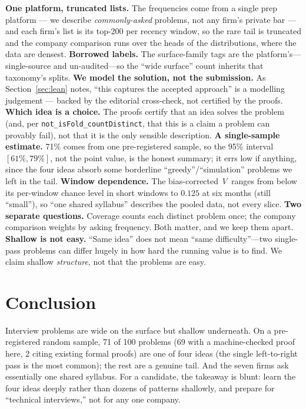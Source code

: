 \documentclass[11pt]{article}
\newcommand{\V}{\textit{V}}
\begin{document}
\textbf{One platform, truncated lists.} The frequencies come from a single prep platform ---
we describe \emph{commonly-asked} problems, not any firm's private bar --- and each firm's
list is its top-200 per recency window, so the rare tail is truncated and the company
comparison runs over the heads of the distributions, where the data are densest. \textbf{Borrowed labels.} The surface-family tags are the platform's---single-source and
un-audited---so the ``wide surface'' count inherits that taxonomy's splits. \textbf{We model the solution, not the
submission.} As Section~\ref{sec:lean} notes, ``this captures the accepted approach'' is a
modelling judgement --- backed by the editorial cross-check, not certified by the proofs. \textbf{Which idea is a choice.} The proofs
certify that an idea solves the problem
(and, per \texttt{not\_isFold\_countDistinct}, that this is a claim a problem can provably fail), not
that it is the only sensible description. \textbf{A single-sample estimate.} 71\% comes from one
pre-registered sample, so the 95\% interval $[61\%,79\%]$, not the point value, is the honest summary; it
errs low if anything, since the four ideas absorb some borderline ``greedy''/``simulation'' problems we left
in the tail. \textbf{Window dependence.} The bias-corrected \V\ ranges from below its per-window chance
level in short windows to $0.125$ at six months (still ``small''), so ``one shared syllabus''
describes the pooled data, not every slice. \textbf{Two separate questions.} Coverage counts
each distinct problem once; the company comparison weights by asking frequency. Both matter,
and we keep them apart. \textbf{Shallow is not easy.} ``Same idea'' does not mean ``same difficulty''---two single-pass
problems can differ hugely in how hard the running value is to find. We claim shallow \emph{structure}, not
that the problems are easy.

\section{Conclusion}

Interview problems are wide on the surface but shallow underneath. On a pre-registered random sample,
71 of 100 problems (69 with a machine-checked proof here, 2 citing existing formal proofs) are one of four ideas
(the single left-to-right pass is the most common); the rest are a genuine tail. And the seven firms ask
essentially one shared syllabus. For a candidate, the takeaway is blunt: learn the four ideas deeply rather
than dozens of patterns shallowly, and prepare for ``technical interviews,'' not for any one company.
\end{document}
